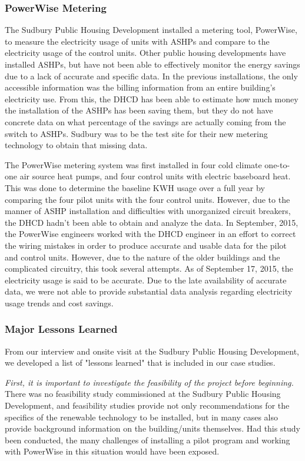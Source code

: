 \subsubsection{PowerWise Metering}
\par The Sudbury Public Housing Development installed a metering tool, PowerWise, to measure the electricity usage of units with ASHPs and compare to the electricity usage of the control units. Other public housing developments have installed ASHPs, but have not been able to effectively monitor the energy savings due to a lack of accurate and specific data. In the previous installations, the only accessible information was the billing information from an entire building’s electricity use. From this, the DHCD has been able to estimate how much money the installation of the ASHPs has been saving them, but they do not have concrete data on what percentage of the savings are actually coming from the switch to ASHPs. Sudbury was to be the test site for their new metering technology to obtain that missing data.
\par The PowerWise metering system was first installed in four cold climate one-to-one air source heat pumps, and four control units with electric baseboard heat. This was done to determine the baseline KWH usage over a full year by comparing the four pilot units with the four control units. However, due to the manner of ASHP installation and difficulties with unorganized circuit breakers, the DHCD hadn’t been able to obtain and analyze the data.  In September, 2015, the PowerWise engineers worked with the DHCD engineer in an effort to correct the wiring mistakes in order to produce accurate and usable data for the pilot and control units. However, due to the nature of the older buildings and the complicated circuitry, this took several attempts. As of September 17, 2015, the electricity usage is said to be accurate. Due to the late availability of accurate data, we were not able to provide substantial data analysis regarding electricity usage trends and cost savings.

\subsubsection{Major Lessons Learned}
\par From our interview and onsite visit at the Sudbury Public Housing Development, we developed a list of "lessons learned" that is included in our case studies.
\par \emph{First, it is important to investigate the feasibility of the project before beginning.} There was no feasibility study commissioned at the Sudbury Public Housing Development, and feasibility studies provide not only recommendations for the specifics of the renewable technology to be installed, but in many cases also provide background information on the building/units themselves. Had this study been conducted, the many challenges of installing a pilot program and working with PowerWise in this situation would have been exposed.

